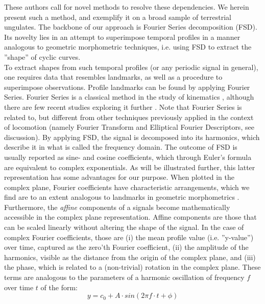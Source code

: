 \documentclass[10pt, a4paper]{article}
\begin{document}
These authors call for novel methods to resolve these dependencies. 
We herein present such a method, and exemplify it on a broad sample of terrestrial ungulates. 
The backbone of our approach is Fourier Series decomposition (FSD). 
Its novelty lies in an attempt to superimpose temporal profiles in a manner analogous to geometric morphometric techniques, i.e. using FSD to extract the ''shape'' of cyclic curves.
\medskip\\To extract shapes from such temporal profiles (or any periodic signal in general), one requires data that resembles landmarks, as well as a procedure to superimpose observations.
Profile landmarks can be found by applying Fourier Series. 
Fourier Series is a classical method in the study of kinematics \citep{Bernstein1927a,Bernstein1935}, although there are few recent studies exploring it further \citep{vanWeeren1992,Grasso2000,Webb2007}. 
Note that Fourier Series is related to, but different from other techniques previously applied in the context of locomotion (namely Fourier Transform and Elliptical Fourier Descriptors, see discussion). 
By applying FSD, the signal is decomposed into its harmonics, which describe it in what is called the frequency domain. 
The outcome of FSD is usually reported as sine- and cosine coefficients, which through Euler's formula are equivalent to complex exponentials. 
As will be illustrated further, this latter representation has some advantages for our purpose. 
When plotted in the complex plane, Fourier coefficients have characteristic arrangements, which we find are to an extent analogous to landmarks in geometric morphometrics \citep{Bookstein1991,Kendall1989}. 
Furthermore, the \textit{affine} components of a signals become mathematically accessible in the complex plane representation. 
Affine components are those that can be scaled linearly without altering the shape of the signal. 
In the case of complex Fourier coefficients, those are (i) the mean profile value (i.e. ''y-value'') over time, captured as the zero'th Fourier coefficient, (ii) the amplitude of the harmonics, visible as the distance from the origin of the complex plane, and (iii) the phase, which is related to a (non-trivial) rotation in the complex plane. 
These terms are analogous to the parameters of a harmonic oscillation of frequency $f$ over time $t$ of the form: 
\begin{equation*}
y = c_0 + A\cdot sin(2\pi f\cdot t + \phi)
\end{equation*}
\end{document}
